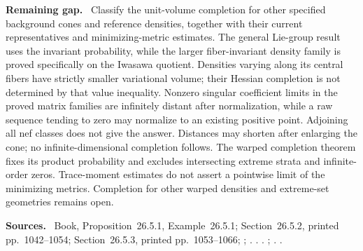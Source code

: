 \documentclass[11pt]{article}
\newcommand{\field}[1]{\par\medskip\noindent\textbf{#1.}\ }
\begin{document}
\field{Remaining gap} Classify the unit-volume completion for other specified background cones and reference densities, together with their current representatives and minimizing-metric estimates. The general Lie-group result uses the invariant probability, while the larger fiber-invariant density family is proved specifically on the Iwasawa quotient. Densities varying along its central fibers have strictly smaller variational volume; their Hessian completion is not determined by that value inequality. Nonzero singular coefficient limits in the proved matrix families are infinitely distant after normalization, while a raw sequence tending to zero may normalize to an existing positive point. Adjoining all nef classes does not give the answer. Distances may shorten after enlarging the cone; no infinite-dimensional completion follows. The warped completion theorem fixes its product probability and excludes intersecting extreme strata and infinite-order zeros. Trace-moment estimates do not assert a pointwise limit of the minimizing metrics. Completion for other warped densities and extreme-set geometries remains open.
\field{Sources} Book, Proposition~26.5.1, Example~26.5.1; Section~26.5.2, printed pp.~1042--1054; Section~26.5.3, printed pp.~1053--1066; ; . . . ; . .
\end{document}

